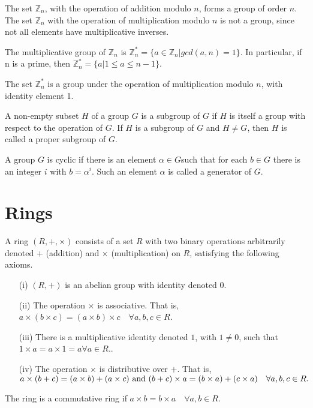 \begin{myexample} 
	The set $\mathbb{Z}_n$, with the operation of addition modulo $n$, forms a group of order $n$. 
	The set $\mathbb{Z}_n$ with the operation of multiplication modulo $n$ is not a group, since not all elements have multiplicative inverses. 
\end{myexample}

\begin{mydef} 
	The multiplicative group of $\mathbb{Z}_n$ is $\mathbb{Z}_n^* = \{a \in \mathbb{Z}_n | gcd(a, n) = 1\}$. 
	In particular, if n is a prime, then $\mathbb{Z}_n^* = \{a | 1 \leq a \leq n − 1\}$.
\end{mydef}

\begin{myexample} 
	The set $\mathbb{Z}_n^*$ is a group under the operation of multiplication modulo $n$, with identity element 1.\end{myexample}

\begin{mydef}
	A non-empty subset $H$ of a group $G$ is a subgroup of $G$ if $H$ is itself a group
	with respect to the operation of $G$. If $H$ is a subgroup of $G$ and $H \neq G$, then $H$ is called a proper subgroup of $G$.
\end{mydef}

\begin{mydef} 
	A group $G$ is cyclic if there is an element $α \in G $such that for each $b \in G$ there is an integer $i$ with $b= \alpha^i$. Such an element $\alpha$ is called a generator of $G$. 
\end{mydef}

\section{Rings}

\begin{mydef} 
	A ring $(R,+,\times)$ consists of a set $R$ with two binary operations arbitrarily denoted $+$ (addition) and $\times$ (multiplication) on $R$, satisfying the following axioms.
	\begin{itemize}
		\item[(i)] $(R, +)$ is an abelian group with identity denoted $0$.
		\item[(ii)] The operation $\times$ is associative. That is, $a \times (b \times c) = (a \times b)\times c \quad \forall a, b, c \in R$.
		\item[(iii)] There is a multiplicative identity denoted $1$, with $1 \neq 0$, such that $1 \times a = a \times 1 = a \forall a \in R.$.
		\item[(iv)] The operation $\times$ is distributive over $+$. That is, $a \times (b+c) = (a \times b)+(a \times c) \textmd{ and } (b + c) \times a = (b \times a) + (c \times a) \quad \forall a, b, c \in R.$
		
	\end{itemize} 
	The ring is a commutative ring if $a \times b = b \times a \quad \forall a, b \in R$.
\end{mydef}

